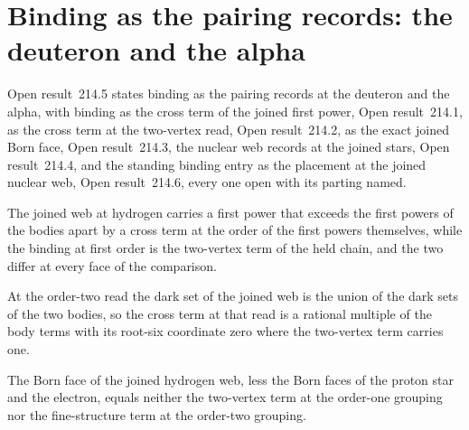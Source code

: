 \section{Binding as the pairing records: the deuteron and the alpha}\label{mod:IX-6-binding-as-the-pairing-records-the-deuteron-and-the-alpha}
\label{narr:open:9-6}Open result~214.5 states binding as the pairing records at the deuteron and the alpha, with binding as the cross term of the joined first power, Open result~214.1, as the cross term at the two-vertex read, Open result~214.2, as the exact joined Born face, Open result~214.3, the nuclear web records at the joined stars, Open result~214.4, and the standing binding entry as the placement at the joined nuclear web, Open result~214.6, every one open with its parting named.
\begin{chwall}\label{box:IX-6-binding-as-the-pairing-records-the-deuteron-and-the-alpha:1}
The joined web at hydrogen carries a first power that exceeds the first powers of the bodies apart by a cross term at the order of the first powers themselves, while the binding at first order is the two-vertex term of the held chain, and the two differ at every face of the comparison.
\end{chwall}
\begin{chwall}\label{box:IX-6-binding-as-the-pairing-records-the-deuteron-and-the-alpha:2}
At the order-two read the dark set of the joined web is the union of the dark sets of the two bodies, so the cross term at that read is a rational multiple of the body terms with its root-six coordinate zero where the two-vertex term carries one.
\end{chwall}
\begin{chwall}\label{box:IX-6-binding-as-the-pairing-records-the-deuteron-and-the-alpha:3}
The Born face of the joined hydrogen web, less the Born faces of the proton star and the electron, equals neither the two-vertex term at the order-one grouping nor the fine-structure term at the order-two grouping.
\end{chwall}
